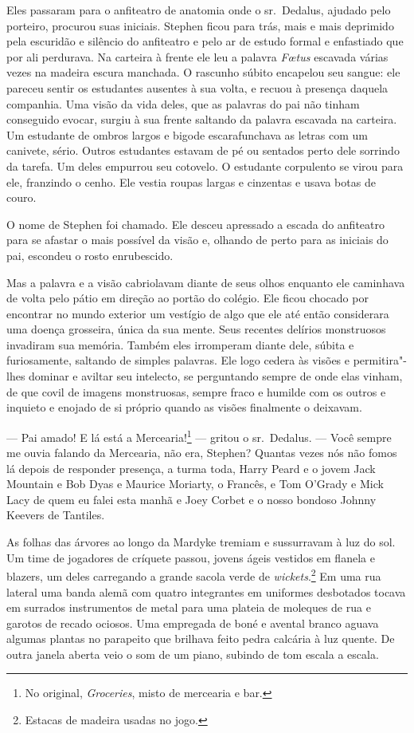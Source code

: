 Eles passaram para o anfiteatro de anatomia onde o sr.~Dedalus, ajudado
pelo porteiro, procurou suas iniciais. Stephen ficou para trás,
mais e mais deprimido pela escuridão e silêncio do anfiteatro e pelo ar
de estudo formal e enfastiado que por ali perdurava. Na carteira à
frente ele leu a palavra \textit{Fœtus} escavada várias vezes na madeira
escura manchada. O rascunho súbito encapelou seu sangue: ele pareceu
sentir os estudantes ausentes à sua volta, e recuou à presença daquela
companhia. Uma visão da vida deles, que as palavras do pai não tinham
conseguido evocar, surgiu à sua frente saltando da palavra escavada na
carteira. Um estudante de ombros largos e bigode escarafunchava as
letras com um canivete, sério. Outros estudantes estavam de pé ou
sentados perto dele sorrindo da tarefa. Um deles empurrou seu cotovelo.
O estudante corpulento se virou para ele, franzindo o cenho. Ele vestia
roupas largas e cinzentas e usava botas de couro.

O nome de Stephen foi chamado. Ele desceu apressado a escada do
anfiteatro para se afastar o mais possível da visão e, olhando de perto
para as iniciais do pai, escondeu o rosto enrubescido.

Mas a palavra e a visão cabriolavam diante de seus olhos enquanto ele
caminhava de volta pelo pátio em direção ao portão do colégio. Ele
ficou chocado por encontrar no mundo exterior um vestígio de algo que
ele até então considerara uma doença grosseira, única da sua mente.
Seus recentes delírios monstruosos invadiram sua memória. Também eles
irromperam diante dele, súbita e furiosamente, saltando de simples
palavras. Ele logo cedera às visões e permitira"-lhes dominar e aviltar
seu intelecto, se perguntando sempre de onde elas vinham, de que covil
de imagens monstruosas, sempre fraco e humilde com os outros e inquieto
e enojado de si próprio quando as visões finalmente o deixavam.

 --- Pai amado! E lá está a Mercearia!\footnote{ No original,
\textit{Groceries}, misto de mercearia e
bar.} --- gritou o sr.~Dedalus. --- Você sempre me ouvia falando da Mercearia,
não era, Stephen? Quantas vezes nós não fomos lá depois de responder
presença, a turma toda, Harry Peard e o jovem Jack Mountain e Bob Dyas
e Maurice Moriarty, o Francês, e Tom O’Grady e Mick
Lacy de quem eu falei esta manhã e Joey Corbet e o nosso bondoso Johnny
Keevers de Tantiles.

As folhas das árvores ao longo da Mardyke tremiam e sussurravam à luz do
sol. Um time de jogadores de críquete passou, jovens ágeis vestidos em
flanela e blazers, um deles carregando a grande sacola verde de 
\textit{wickets}.\footnote{ Estacas de madeira usadas no jogo.} Em uma
rua lateral uma banda alemã com quatro integrantes em uniformes
desbotados tocava em surrados instrumentos de metal para uma plateia de
moleques de rua e garotos de recado ociosos. Uma empregada de boné e
avental branco aguava algumas plantas no parapeito que brilhava feito
pedra calcária à luz quente. De outra janela aberta veio o som de um
piano, subindo de tom escala a escala.

